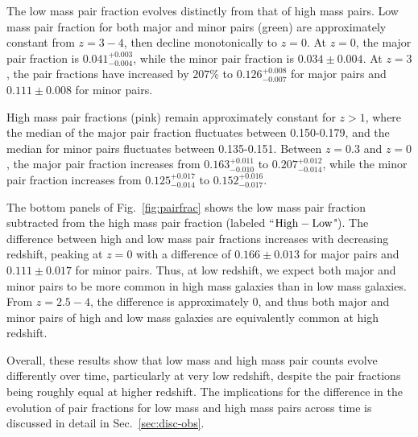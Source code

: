 \documentclass[twocolumn]{aastex631}
\begin{document}
    The low mass pair fraction evolves distinctly from that of high mass pairs.
    Low mass pair fraction for both major and minor pairs (green) are approximately constant from $z=3-4$, then decline monotonically to $z=0$. At $z=0$, the major pair fraction is $0.041^{+0.003}_{-0.004}$, while the minor pair fraction is $0.034\pm0.004$.
    At $z=3$, the pair fractions have increased by $207\%$ to $0.126^{+0.008}_{-0.007}$ for major pairs and $0.111\pm0.008$ for minor pairs. 

    High mass pair fractions (pink) remain approximately constant for $z>1$, where the median of the major pair fraction fluctuates between 0.150-0.179, and the median for minor pairs fluctuates between 0.135-0.151.
    Between $z=0.3$ and $z=0$, the major pair fraction increases from $0.163^{+0.011}_{-0.010}$ to $0.207^{+0.012}_{-0.014}$, while the minor pair fraction increases from $0.125^{+0.017}_{-0.014}$ to $0.152^{+0.016}_{-0.017}$.
    
    The bottom panels of Fig.~\ref{fig:pairfrac} shows the low mass pair fraction subtracted from the high mass pair fraction (labeled ``$\rm High-Low$").
    The difference between high and low mass pair fractions increases with decreasing redshift, peaking at $z=0$ with a difference of $0.166\pm0.013$ for major pairs and $0.111\pm0.017$ for minor pairs. 
    Thus, at low redshift, we expect both major and minor pairs to be more common in high mass galaxies than in low mass galaxies. 
    From $z=2.5-4$, the difference is approximately 0, and thus both major and minor pairs of high and low mass galaxies are equivalently common at high redshift. 
    
    Overall, these results show that low mass and high mass pair counts evolve differently over time, particularly at very low redshift, despite the pair fractions being roughly equal at higher redshift. 
    The implications for the difference in the evolution of pair fractions for low mass and high mass pairs across time is discussed in detail in Sec.~\ref{sec:disc-obs}.
    
\end{document}
